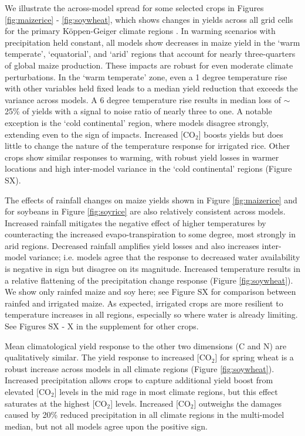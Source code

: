 \documentclass[gmd, manuscript]{copernicus} %
\begin{document}
We illustrate the across-model spread for some selected crops in Figures \ref{fig:maizerice} - \ref{fig:soywheat}, which shows changes in yields across all grid cells for the primary K\"{o}ppen-Geiger climate regions \citep{rubel2010}. 
In warming scenarios with precipitation held constant, all models show decreases in maize yield in the `warm temperate', `equatorial', and `arid' regions that account for nearly three-quarters of global maize production. 
These impacts are robust for even moderate climate perturbations. 
In the `warm temperate' zone, even a 1 degree temperature rise with other variables held fixed leads to a median yield reduction that exceeds the variance across models. 
A 6 degree temperature rise results in median loss of $\sim$25\% of yields with a signal to noise ratio of nearly three to one. A notable exception is the `cold continental' region, where models disagree strongly, extending even to the sign of impacts. 
Increased [CO$_2$] boosts yields but does little to change the nature of the temperature response for irrigated rice.
Other crops show similar responses to warming, with robust yield losses in warmer locations and high inter-model variance in the `cold continental' regions (Figure SX).

The effects of rainfall changes on maize yields shown in Figure \ref{fig:maizerice} and for soybeans in Figure \ref{fig:soyrice} are also relatively consistent across models. 
Increased rainfall mitigates the negative effect of higher temperatures by counteracting the increased evapo-transpiration to some degree, most strongly in arid regions.
Decreased rainfall amplifies yield losses and also increases inter-model variance; i.e. models agree that the response to decreased water availability is negative in sign but disagree on its magnitude.
Increased temperature results in a relative flattening of the precipitation change response (Figure \ref{fig:soywheat}).
We show only rainfed maize and soy here; see Figure SX for comparison between rainfed and irrigated maize. 
As expected, irrigated crops are more resilient to temperature increases in all regions, especially so where water is already limiting. 
See Figures SX - X in the supplement for other crops.   

Mean climatological yield response to the other two dimensions (C and N) are qualitatively similar. 
The yield response to increased [CO$_2$] for spring wheat is a robust increase across models in all climate regions (Figure \ref{fig:soywheat}). 
Increased precipitation allows crops to capture additional yield boost from elevated [CO$_2$] levels in the mid rage in most climate regions, but this effect saturates at the highest [CO$_2$] levels. 
Increased [CO$_2$] outweighs the damages caused by 20\% reduced precipitation in all climate regions in the multi-model median, but not all models agree upon the positive sign.
\end{document}
